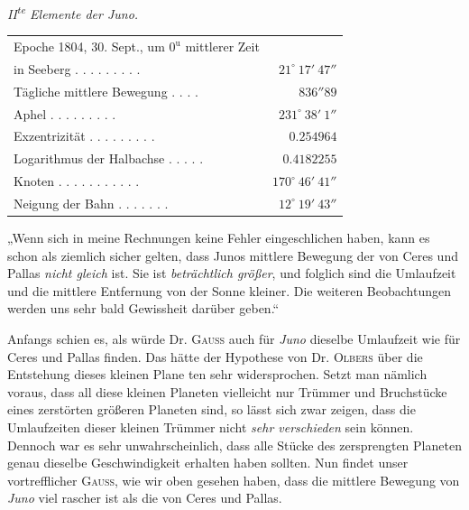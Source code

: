 \begin{center}
\emph{II\textsuperscript{te} Elemente der Juno.}
\end{center}

\begin{center}
\begingroup\fontsize{9}{11}\selectfont\setlength{\tabcolsep}{3pt}\renewcommand{\arraystretch}{1.1}
\begin{tabular}{lr}
Epoche 1804, 30. Sept., um $0^{\mathrm u}$ mittlerer Zeit  &  \\
\quad in Seeberg . . . . . . . . . & $21^\circ\ 17'\ 47''$ \\
Tägliche mittlere Bewegung . . . . & $836''89$ \\
Aphel . . . . . . . . . & $231^\circ\ 38'\ 1''$ \\
Exzentrizität . . . . . . . . . & $0.254964$ \\
Logarithmus der Halbachse . . . . . & $0.4182255$ \\
Knoten . . . . . . . . . . . & $170^\circ\ 46'\ 41''$ \\
Neigung der Bahn . . . . . . . & $12^\circ\ 19'\ 43''$ \\
\end{tabular}\endgroup
\end{center}


„Wenn sich in meine Rechnungen keine Fehler eingeschlichen haben, kann es schon als ziemlich sicher gelten, dass Junos mittlere Bewegung der von Ceres und Pallas \emph{nicht gleich} ist. Sie ist \emph{beträchtlich größer}, und folglich sind die Umlaufzeit und die mittlere Entfernung von der Sonne kleiner. Die weiteren Beobachtungen werden uns sehr bald Gewissheit darüber geben.“

Anfangs schien es, als würde Dr. \textsc{Gauss} auch für \emph{Juno} dieselbe Umlaufzeit wie für Ceres und Pallas finden. Das hätte der Hypothese von Dr. \textsc{Olbers} über die Entstehung dieses kleinen Plane%
%
ten sehr widersprochen. Setzt man nämlich voraus, dass all diese kleinen Planeten vielleicht nur Trümmer und Bruchstücke eines zerstörten größeren Planeten sind, so lässt sich zwar zeigen, dass die Umlaufzeiten dieser kleinen Trümmer nicht \emph{sehr verschieden} sein können. Dennoch war es sehr unwahrscheinlich, dass alle Stücke des zersprengten Planeten genau dieselbe Geschwindigkeit erhalten haben sollten. Nun findet unser vortrefflicher \textsc{Gauss}, wie wir oben gesehen haben, dass die mittlere Bewegung von \emph{Juno} viel rascher ist als die von Ceres und Pallas.

